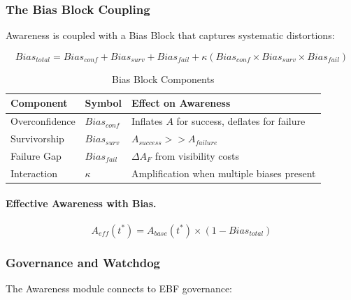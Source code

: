 \subsubsection{The Bias Block Coupling}

Awareness is coupled with a Bias Block that captures systematic distortions:

\begin{equation}
Bias_{total} = Bias_{conf} + Bias_{surv} + Bias_{fail} + \kappa(Bias_{conf} \times Bias_{surv} \times Bias_{fail})
\end{equation}

\begin{table}[htbp]
\centering
\caption{Bias Block Components}
\label{tab:bias-block}
\renewcommand{\arraystretch}{1.3}
\begin{tabular}{@{}lll@{}}
\toprule
\textbf{Component} & \textbf{Symbol} & \textbf{Effect on Awareness} \\
\midrule
Overconfidence & $Bias_{conf}$ & Inflates $A$ for success, deflates for failure \\
Survivorship & $Bias_{surv}$ & $A_{success} >> A_{failure}$ \\
Failure Gap & $Bias_{fail}$ & $\Delta A_F$ from visibility costs \\
Interaction & $\kappa$ & Amplification when multiple biases present \\
\bottomrule
\end{tabular}
\end{table}

\paragraph{Effective Awareness with Bias.}
\begin{equation}
A_{eff}(t^*) = A_{base}(t^*) \times (1 - Bias_{total})
\end{equation}

\subsubsection{Governance and Watchdog}

The Awareness module connects to EBF governance:

